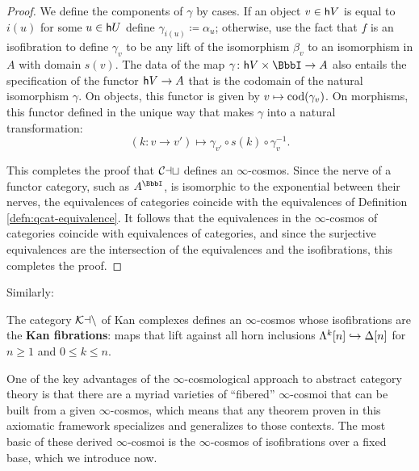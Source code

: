 \begin{proof}
We define the components of $\gamma$ by cases. If an object $v \in {\mathord{\mathsf{h}}}{V}$ is equal to $i(u)$ for some $u \in {\mathord{\mathsf{h}}}{U}$ define $\gamma_{i(u)} \coloneq \alpha_u$; otherwise, use the fact that $f$ is an isofibration to define $\gamma_v$ to be any lift of the isomorphism $\beta_v$ to an isomorphism in $A$ with domain $s(v)$. The data of the map $\gamma \colon \ho{V} \times \iso \to A$ also entails the specification of the functor ${\mathord{\mathsf{h}}}{V} \to A$ that is the codomain of the natural isomorphism $\gamma$. On objects, this functor is given by $v \mapsto \textup{cod}(\gamma_v)$. On morphisms, this functor defined in the unique way that makes $\gamma$ into a natural transformation:
\[ (k \colon v \to v') \mapsto  \gamma_{v'} \circ s(k) \circ \gamma_v^{-1}.\]

This completes the proof that ${\mathord{\mathcal{Cat}}}$ defines an $\infty$-cosmos. Since the nerve of a functor category, such as $A^\iso$, is isomorphic to the exponential between their nerves, the equivalences of categories coincide with the equivalences of Definition \ref{defn:qcat-equivalence}. It follows that the equivalences in the $\infty$-cosmos of categories coincide with equivalences of categories, and since the surjective equivalences are the intersection of the equivalences and the isofibrations, this completes the proof.
\end{proof}

Similarly:

\begin{proposition}\label{prop:kan-cosmos}
   The category ${\mathord{\mathcal{Kan}}}$ of Kan complexes defines an $\infty$-cosmos whose isofibrations are the \textbf{Kan fibrations}: maps that lift against all horn inclusions $\Lambda^k[n] \hookrightarrow \Delta[n]$ for $n \geq 1$ and $0 \leq k \leq n$.
\end{proposition}

One of the key advantages of the $\infty$-cosmological approach to abstract category theory is that there are a myriad varieties of ``fibered'' $\infty$-cosmoi that can be built from a given $\infty$-cosmos, which means that any theorem proven in this axiomatic framework specializes and generalizes to those contexts. The most basic of these derived $\infty$-cosmoi is the $\infty$-cosmos of isofibrations over a fixed base, which we introduce now. %

